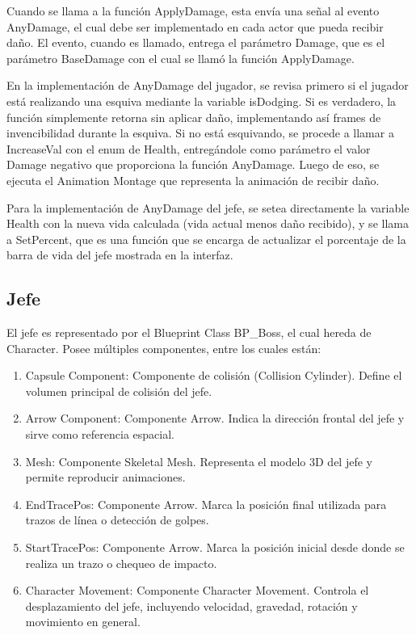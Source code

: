 \documentclass[informe]{upropuesta}
\begin{document}
Cuando se llama a la función ApplyDamage, esta envía una señal al evento AnyDamage, el cual debe ser implementado en cada actor que pueda recibir daño. El evento, cuando es llamado, entrega el parámetro Damage, que es el parámetro BaseDamage con el cual se llamó la función ApplyDamage.

En la implementación de AnyDamage del jugador, se revisa primero si el jugador está realizando una esquiva mediante la variable isDodging. Si es verdadero, la función simplemente retorna sin aplicar daño, implementando así frames de invencibilidad durante la esquiva. Si no está esquivando, se procede a llamar a IncreaseVal con el enum de Health, entregándole como parámetro el valor Damage negativo que proporciona la función AnyDamage. Luego de eso, se ejecuta el Animation Montage que representa la animación de recibir daño.

Para la implementación de AnyDamage del jefe, se setea directamente la variable Health con la nueva vida calculada (vida actual menos daño recibido), y se llama a SetPercent, que es una función que se encarga de actualizar el porcentaje de la barra de vida del jefe mostrada en la interfaz.

\subsection{Jefe}

El jefe es representado por el Blueprint Class BP\_Boss, el cual hereda de Character. Posee múltiples componentes, entre los cuales están:


\begin{enumerate}
    \item Capsule Component: Componente de colisión (Collision Cylinder). Define el volumen principal de colisión del jefe.
    \item Arrow Component: Componente Arrow. Indica la dirección frontal del jefe y sirve como referencia espacial.
    \item Mesh: Componente Skeletal Mesh. Representa el modelo 3D del jefe y permite reproducir animaciones.
    \item EndTracePos: Componente Arrow. Marca la posición final utilizada para trazos de línea o detección de golpes.
    \item StartTracePos: Componente Arrow. Marca la posición inicial desde donde se realiza un trazo o chequeo de impacto.
    \item Character Movement: Componente Character Movement. Controla el desplazamiento del jefe, incluyendo velocidad, gravedad, rotación y movimiento en general.
\end{enumerate}
\end{document}
